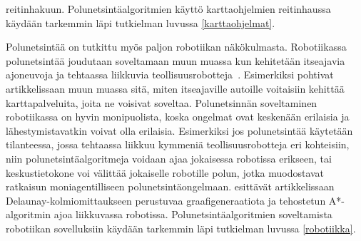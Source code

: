 reitinhakuun. Polunetsintäalgoritmien käyttö karttaohjelmien reitinhaussa 
käydään tarkemmin läpi tutkielman luvussa \ref{karttaohjelmat}.\par
	Polunetsintää on tutkittu myös paljon robotiikan näkökulmasta. 
Robotiikassa polunetsintää joudutaan soveltamaan muun muassa kun 
kehitetään itseajavia ajoneuvoja ja tehtaassa liikkuvia 
teollisuusrobotteja~\cite{arXivMAPF}. Esimerkiksi \textcite{Lanelet2} 
pohtivat artikkelissaan muun muassa sitä, miten itseajaville autoille 
voitaisiin kehittää karttapalveluita, joita ne voisivat soveltaa. 
Polunetsinnän soveltaminen robotiikassa on hyvin monipuolista, koska 
ongelmat ovat keskenään erilaisia ja lähestymistavatkin voivat olla 
erilaisia. Esimerkiksi jos polunetsintää käytetään tilanteessa, jossa 
tehtaassa liikkuu kymmeniä teollisuusrobotteja eri kohteisiin, niin 
polunetsintäalgoritmeja voidaan ajaa jokaisessa robotissa erikseen, tai 
keskustietokone voi välittää jokaiselle robotille polun, jotka muodostavat 
ratkaisun moniagentilliseen polunetsintäongelmaan. 
\textcite{DelaunayVoronoiAStar} esittävät artikkelissaan 
Delaunay-kolmiomittaukseen perustuvaa graafigeneraatiota ja tehostetun 
A*-algoritmin ajoa liikkuvassa robotissa. Polunetsintäalgoritmien 
soveltamista robotiikan sovelluksiin käydään tarkemmin läpi tutkielman 
luvussa \ref{robotiikka}.
